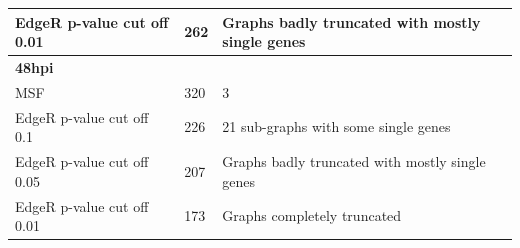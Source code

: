 \documentclass[10pt,a4paper,twocolumn]{article}
\begin{document}
\begin{table}[]
\begin{tabular}{lll}
		\multicolumn{1}{|l|}{EdgeR p-value cut off 0.01} & \multicolumn{1}{l|}{262}                                             & \multicolumn{1}{l|}{Graphs badly truncated with mostly single genes}   \\ \hline
		\multicolumn{1}{|l|}{\textbf{48hpi}}             & \multicolumn{1}{l|}{}                                                & \multicolumn{1}{l|}{}                                                  \\ \hline
		\multicolumn{1}{|l|}{MSF}                        & \multicolumn{1}{l|}{320}                                             & \multicolumn{1}{l|}{3}                                                 \\ \hline
		\multicolumn{1}{|l|}{EdgeR p-value cut off 0.1}  & \multicolumn{1}{l|}{226}                                             & \multicolumn{1}{l|}{21 sub-graphs with some single genes}              \\ \hline
		\multicolumn{1}{|l|}{EdgeR p-value cut off 0.05} & \multicolumn{1}{l|}{207}                                             & \multicolumn{1}{l|}{Graphs badly truncated with mostly single genes}   \\ \hline
		\multicolumn{1}{|l|}{EdgeR p-value cut off 0.01} & \multicolumn{1}{l|}{173}                                             & \multicolumn{1}{l|}{Graphs completely truncated}                       \\ \hline                                                                      
	\end{tabular}
\end{table}
\end{document}
